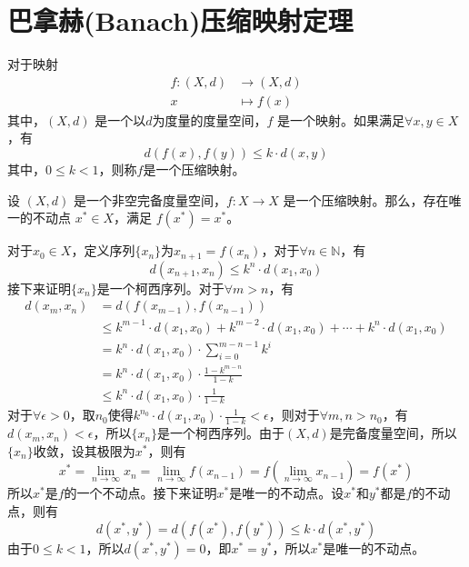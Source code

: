 \section{巴拿赫(Banach)压缩映射定理}
\begin{defn}[压缩映射]\label{def:comp_map}
    对于映射
\begin{align*}
    f : (X,d) & \to (X,d) \\
    x & \mapsto f(x)
\end{align*}
其中，$(X,d)$ 是一个以$d$为度量的度量空间，$f$ 是一个映射。如果满足$\forall x, y \in X$，有
\begin{equation}
    d(f(x), f(y)) \leq k \cdot d(x, y)
\end{equation}
其中，$0 \leq k < 1$，则称$f$是一个压缩映射。
\end{defn}

\begin{thm}[巴拿赫压缩映射定理]\label{thm:banach}
    设 $(X, d)$ 是一个非空完备度量空间，$f : X \to X$ 是一个压缩映射。那么，存在唯一的不动点 $x^* \in X$，满足 $f(x^*) = x^*$。
\end{thm}
\begin{pf}
    对于$x_0 \in X$，定义序列$\{x_n\}$为$x_{n+1}=f(x_n)$，对于$\forall n \in \mathbb{N}$，有
    \begin{equation*}
        d(x_{n+1}, x_n)  \leq k^n \cdot d(x_1, x_0)
    \end{equation*}
    接下来证明$\{x_n\}$是一个柯西序列。对于$\forall m > n$，有
    \begin{align*}
        d(x_m, x_n) & = d(f(x_{m-1}), f(x_{n-1})) \\
        & \leq k^{m-1} \cdot d(x_1, x_0) + k^{m-2} \cdot d(x_1, x_0) + \cdots + k^{n} \cdot d(x_1, x_0) \\
        & = k^n \cdot d(x_1, x_0) \cdot \sum_{i=0}^{m-n-1} k^i \\
        & = k^n \cdot d(x_1, x_0) \cdot \frac{1-k^{m-n}}{1-k} \\
        & \leq k^n \cdot d(x_1, x_0) \cdot \frac{1}{1-k}
    \end{align*}
    对于$\forall \epsilon > 0$，取$n_0$使得$k^{n_0} \cdot d(x_1, x_0) \cdot \frac{1}{1-k} < \epsilon$，则对于$\forall m, n > n_0$，有$d(x_m, x_n) < \epsilon$，所以$\{x_n\}$是一个柯西序列。由于$(X, d)$是完备度量空间，所以$\{x_n\}$收敛，设其极限为$x^*$，则有
    \begin{equation*}
        x^* = \lim_{n \to \infty} x_n = \lim_{n \to \infty} f(x_{n-1}) = f(\lim_{n \to \infty} x_{n-1}) = f(x^*)
    \end{equation*}
    所以$x^*$是$f$的一个不动点。接下来证明$x^*$是唯一的不动点。设$x^*$和$y^*$都是$f$的不动点，则有
    \begin{equation*}
        d(x^*, y^*) = d(f(x^*), f(y^*)) \leq k \cdot d(x^*, y^*)
    \end{equation*}
    由于$0 \leq k < 1$，所以$d(x^*, y^*) = 0$，即$x^* = y^*$，所以$x^*$是唯一的不动点。
\end{pf}